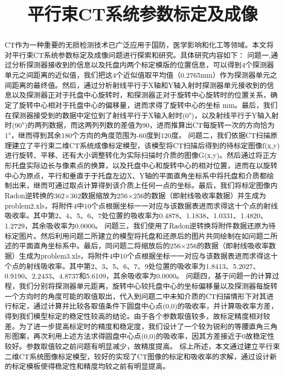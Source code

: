 \documentclass[bwprint]{cumcmthesis}
\title{平行束CT系统参数标定及成像}
\begin{document}
 \maketitle
 \begin{abstract}
 CT作为一种重要的无损检测技术已广泛应用于国防，医学影响和化工等领域。本文将对平行束CT系统参数标定及成像问题进行探索和研究。具体研究内容如下：
问题一,通过分析探测器接收到的信息以及托盘内两个标定模版的位置信息，可以得到4个探测器单元之间距离的近似值，我们把这4个近似值取平均值（0.2765mm）作为探测器单元之间距离的最终值。然后，通过分析射线平行于X轴和Y轴入射时探测器单元接收到的信息以及探测器正对于托盘中心旋转时，和探测器正对于旋转中心旋转时的位置关系，确定了旋转中心相对于托盘中心的偏移量，进而求得了旋转中心的坐标 mm。最后，我们在探测器接受到的数据中定位到了射线平行于X轴入射时(0°)，以及射线平行于Y轴入射时(90°)的两列数据，而这两列列数的差值为90，进而推算出CT每旋转一次的方向恰为1°，继而得到其余180个方向的角度范围为-60度到120度。
问题二，我们依据CT扫描原理建立了平行束二维CT系统成像标定模型，该模型将CT扫描后得到的待标定图像f(x,y)进行旋转、平移、还有大小调整转化为实际扫描时介质的图像G(x,y)。然后通过将正方形托盘实际边长与像素点的换算，以及托盘中心和旋转中心的相对位置，进而在以旋转中心为原点，平行和垂直于于托盘左边X、Y轴的平面直角坐标系中将托盘和介质都绘制出来，继而可通过取点计算得到该介质上任何一点的坐标。最后，我们将标定图像内Radon逆转换的362×362数据缩放为256×256的数据（即射线吸收率数据）并生成为problem2.xls，将附件4中10个点根据坐标一一对应与该数据表进而求得这十个点的射线吸收率。其中第2、4、5、6、7处位置的吸收率为0.4878、1.1838、1.0331、1.4820、1.2729，其余吸收率为0.0000。
问题三，我们使用了Radon逆转换将附件数据还原为待标定图片。然后利用问题二所建立的模型将托盘和还原后的图片共同绘制在如问题二所述的平面直角坐标系中。最后，同问题二将缩放后的256×256的数据（即射线吸收率数据）生成为problem3.xls，将附件4中10个点根据坐标一一对应与该数据表进而求得这十个点的射线吸收率。其中第2、3、5、6、7、9处位置的吸收率为1.8413、5.2027、0.9190、2.2433、4.8737和5.6109，其余吸收率为0.0000。
问题四，基于问题一的计算过程，我们分别将探测器单元距离，旋转中心较托盘中心的坐标偏移量以及探测器每旋转一个方向时的角度可能的取值取出，代入到问题二中未知介质的CT扫描情形下对其进行标定，通过计算并比较各取值条件下圆盘中心点(0,0)的吸收率，并计算吸收率方差，得到我们模型标定的稳定性较高的结论。由于各个参数取值较多，故标定精度相对较差。为了进一步提高标定时的精度和稳定度，我们设计了一个较为锐利的等腰直角三角形图案，再次利用上述方法求得圆盘中心点(0,0)的吸收率，因其方差接近于0故稳定性较好。参数取值较之前问题有明显减少，故精度提高。
综上所述，本文通过建立平行束二维CT系统图像标定模型，较好的实现了CT图像的标定和吸收率的求解，通过设计新的标定模板使得稳定性和精度均较之前有明显提高。


\end{abstract}
\end{document}
